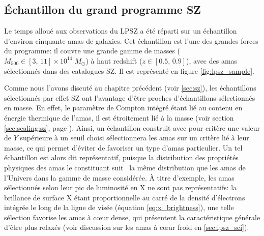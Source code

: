 \subsection{Échantillon du grand programme SZ}

Le temps alloué aux observations du LPSZ a été réparti sur un échantillon d'environ cinquante amas de galaxies.
Cet échantillon est l'une des grandes forces du programme: il couvre une grande gamme de masses ($M_{500} \in [3,\,11] \times 10^{14} \;M_\odot$) à haut redshift ($z \in [0.5,\,0.9]$), avec des amas sélectionnés dans des catalogues SZ.
Il est représenté en figure \ref{fig:lpsz_sample}.

Comme nous l'avons discuté au chapitre précédent (voir \ref{sec:sz}), les échantillons sélectionnés par effet SZ ont l'avantage d'être proches d'échantillons sélectionnés en masse.
En effet, le paramètre de Compton intégré étant lié au contenu en énergie thermique de l'amas, il est étroitement lié à la masse (voir section \ref{sec:scaling:sz}, page \pageref{sec:scaling:sz}).
Ainsi, un échantillon construit avec pour critère une valeur de $Y$ supérieure à un seuil choisi sélectionnera les amas sur un critère lié à leur masse, ce qui permet d'éviter de favoriser un type d'amas particulier.
Un tel échantillon est alors dit représentatif, puisque la distribution des propriétés physiques des amas le constituant suit \prior\ la même distribution que les amas de l'Univers dans la gamme de masse considérée.
À titre d'exemple, les amas sélectionnés selon leur pic de luminosité en X ne sont pas représentatifs: la brillance de surface X étant proportionnelle au carré de la densité d'électrons intégrée le long de la ligne de visée (équation \ref{eq:x_brightness}), une telle sélection favorise les amas à cœur dense, qui présentent la caractéristique générale d'être plus relaxés (voir discussion sur les amas à cœur froid en \ref{sec:lpsz_sci}).

